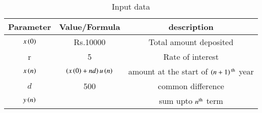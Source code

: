 \begin{table}[h]
\renewcommand\thetable{1}
    \centering
    \begin{tabular}{|c|c|c|}
        \hline
        \textbf{Parameter} & \textbf{Value/Formula} & \textbf{description}\\
        \hline
        $x\left(0\right)$ & Rs.10000 & Total amount deposited \\
        \hline
        r & 5 & Rate of interest\\
        \hline
        $x\left(n\right)$ & $\left(x\left(0\right) + nd\right)u\left(n\right)$ & amount at the start of $\left(n+1\right)\textsuperscript{th}$ year\\
        \hline
        $d$ & 500 & common difference \\
        \hline
        $y\left(n\right)$ &  & sum upto $n\textsuperscript{th}$ term\\
        \hline
    \end{tabular}
    \caption{Input data}
    \label{tab:Input data}
\end{table}
